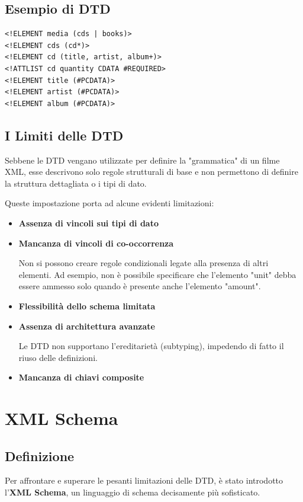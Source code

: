 \subsection{Esempio di DTD}

\begin{tcolorbox}[title=Esempio di DTD]
    \begin{lstlisting}
<!ELEMENT media (cds | books)>
<!ELEMENT cds (cd*)>
<!ELEMENT cd (title, artist, album+)>
<!ATTLIST cd quantity CDATA #REQUIRED>
<!ELEMENT title (#PCDATA)>
<!ELEMENT artist (#PCDATA)>
<!ELEMENT album (#PCDATA)>
    \end{lstlisting}
\end{tcolorbox}

\subsection{I Limiti delle DTD}
Sebbene le DTD vengano utilizzate per definire la "grammatica" di un filme XML, esse descrivono solo regole strutturali di base e non permettono di definire la struttura dettagliata o i tipi di dato.

Queste impostazione porta ad alcune evidenti limitazioni:
\begin{itemize}
    \item \textbf{Assenza di vincoli sui tipi di dato}
    \item \textbf{Mancanza di vincoli di co-occorrenza}

    Non si possono creare regole condizionali legate alla presenza di altri elementi. Ad esempio, non è possibile specificare che l'elemento "unit" debba essere ammesso solo quando è presente anche l'elemento "amount".
    \item \textbf{Flessibilità dello schema limitata}
    \item \textbf{Assenza di architettura avanzate}

    Le DTD non supportano l'ereditarietà (subtyping), impedendo di fatto il riuso delle definizioni.
    \item \textbf{Mancanza di chiavi composite}
\end{itemize}

\section{XML Schema}
\subsection{Definizione}
Per affrontare e superare le pesanti limitazioni delle DTD, è stato introdotto l'\textbf{XML Schema}, un linguaggio di schema decisamente più sofisticato.

